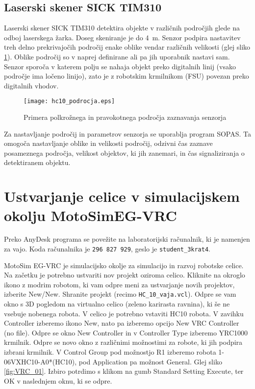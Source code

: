 \subsection{Laserski skener SICK TIM310}

Laserski skener SICK TIM310 detektira objekte v različnih področjih glede na odboj laserskega žarka. Doseg skeniranje je do 4~m. Senzor podpira nastavitev treh delno prekrivajočih področij enake oblike vendar različnih velikosti (glej sliko \ref{fig:hc10_sick}). Oblike področij so  v naprej definirane ali pa jih uporabnik nastavi sam. Senzor sporoča v katerem polju se nahaja objekt preko digitalnih linij (vsako področje ima ločeno linijo), zato je z robotskim krmilnikom (FSU) povezan preko digitalnih vhodov.

\begin{figure}[!hbt]
	\centering
	\texttt{[image: hc10\_podrocja.eps]}
	\caption{Primera polkrožnega in pravokotnega področja zaznavanja senzorja}
	\label{fig:hc10_sick}
\end{figure}

Za nastavljanje področij in parametrov senzorja se uporablja program SOPAS. Ta omogoča nastavljanje oblike in velikosti področij, odzivni čas zaznave posameznega področja, velikost objektov, ki jih zanemari, in čas signaliziranja o detektiranem objektu.

\section{Ustvarjanje celice v simulacijskem okolju MotoSimEG-VRC} \label{sim0}

Preko AnyDesk programa se povežite na laboratorijski računalnik, ki je namenjen za vajo. Koda računalnika je \verb|296 827 929|, geslo je \verb|student_3krat4|.

MotoSim EG-VRC je simulacijsko okolje za simulacijo in razvoj robotske celice. Na začetku je potrebno ustvariti nov projekt oziroma celico. Kliknite na okroglo ikono z modrim robotom, ki vam odpre meni za ustvarjanje novih projektov, izberite New/New. Shranite projekt (recimo \verb|HC_10_vaja.vcl|). Odpre se vam okno s 3D pogledom na virtualno celico (zeleno karirasta ravnina), ki še ne vsebuje nobenega robota. V celico je potrebno vstaviti HC10 robota. V zavihku Controller izberemo ikono New, nato pa izberemo opcijo New VRC Controller (no file). Odpre se okno New Controller in v Controller Type izberemo YRC1000 krmilnik. Odpre se novo okno z različnimi možnostimi za robote, ki jih podpira izbrani krmilnik. V Control Group pod možnostjo R1 izberemo robota 1-06VXHC10-A0*(HC10), pod Application pa možnost General. Glej sliko \ref{fig:VRC_01}. Izbiro potrdimo s klikom na gumb Standard Setting Execute, ter OK v naslednjem oknu, ki se odpre.

